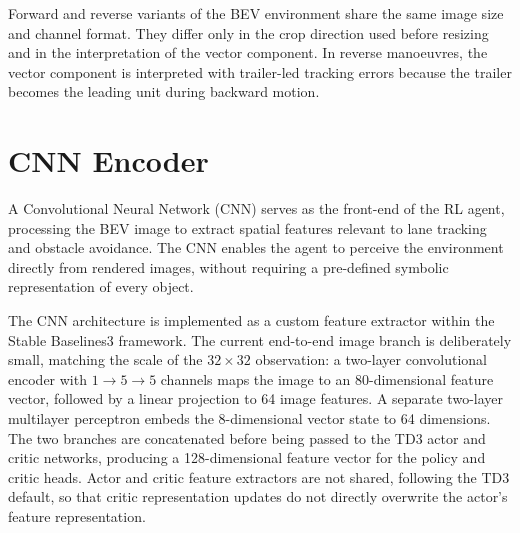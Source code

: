 Forward and reverse variants of the BEV environment share the same image size and channel format. They differ only in the crop direction used before resizing and in the interpretation of the vector component. In reverse manoeuvres, the vector component is interpreted with trailer-led tracking errors because the trailer becomes the leading unit during backward motion.

\section{CNN Encoder}

A Convolutional Neural Network (CNN) serves as the front-end of the RL agent, processing the BEV image to extract spatial features relevant to lane tracking and obstacle avoidance. The CNN enables the agent to perceive the environment directly from rendered images, without requiring a pre-defined symbolic representation of every object.

The CNN architecture is implemented as a custom feature extractor within the Stable Baselines3 framework. The current end-to-end image branch is deliberately small, matching the scale of the $32 \times 32$ observation: a two-layer convolutional encoder with $1 \rightarrow 5 \rightarrow 5$ channels maps the image to an 80-dimensional feature vector, followed by a linear projection to 64 image features. A separate two-layer multilayer perceptron embeds the 8-dimensional vector state to 64 dimensions. The two branches are concatenated before being passed to the TD3 actor and critic networks, producing a 128-dimensional feature vector for the policy and critic heads. Actor and critic feature extractors are not shared, following the TD3 default, so that critic representation updates do not directly overwrite the actor's feature representation.

